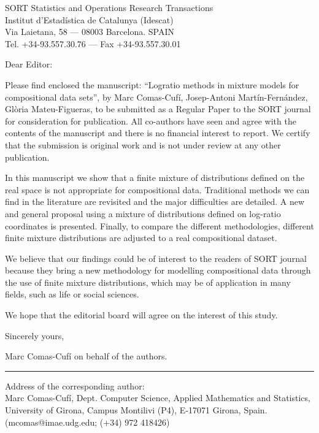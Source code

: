 \documentclass{letter}
\begin{document}
\begin{letter}{
SORT Statistics and Operations Research Transactions\\
Institut d'Estadística de Catalunya (Idescat)\\
Via Laietana, 58 — 08003 Barcelona. SPAIN\\
Tel. +34-93.557.30.76 — Fax +34-93.557.30.01}
\opening{Dear Editor:}

Please find enclosed the manuscript: “Logratio methods in mixture models for compositional data sets”, by Marc Comas-Cufí, Josep-Antoni Martín-Fernández, Glòria Mateu-Figueras, to be submitted as a Regular Paper to the SORT journal for consideration for publication. All co-authors have seen and agree with the contents of the manuscript and there is no financial interest to report. We certify that the submission is original work and is not under review at any other publication.

In this manuscript we show that a finite mixture of distributions defined on the real space is not appropriate for compositional data. Traditional methods we can find in the literature are revisited and the major difficulties are detailed. A new and general proposal using a mixture of distributions defined on log-ratio coordinates is presented. Finally, to compare the different methodologies, different finite mixture distributions are adjusted to a real compositional dataset.

We believe that our findings could be of interest to the readers of SORT journal because they bring a new methodology for modelling compositional data through the use of finite mixture distributions, which may be of application in many fields, such as life or social sciences. 

We hope that the editorial board will agree on the interest of this study.

Sincerely yours,

\bigskip

Marc Comas-Cufí on behalf of the authors.

\noindent\rule{8cm}{0.4pt}

Address of the corresponding author: \\
Marc Comas-Cufí,
Dept. Computer Science, Applied Mathematics and Statistics, University of Girona, Campus Montilivi (P4), E-17071 Girona, Spain. (mcomas@imae.udg.edu; (+34) 972 418426)

\end{letter}
\end{document}
